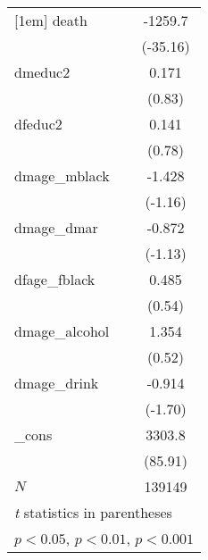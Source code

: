 {\begin{longtable}{l*{1}{c}}
[1em]
death       &     -1259.7\sym{***}\\
            &    (-35.16)         \\
[1em]
dmeduc2     &       0.171         \\
            &      (0.83)         \\
[1em]
dfeduc2     &       0.141         \\
            &      (0.78)         \\
[1em]
dmage\_mblack&      -1.428         \\
            &     (-1.16)         \\
[1em]
dmage\_dmar  &      -0.872         \\
            &     (-1.13)         \\
[1em]
dfage\_fblack&       0.485         \\
            &      (0.54)         \\
[1em]
dmage\_alcohol&       1.354         \\
            &      (0.52)         \\
[1em]
dmage\_drink &      -0.914         \\
            &     (-1.70)         \\
[1em]
\_cons      &      3303.8\sym{***}\\
            &     (85.91)         \\
\hline
\(N\)       &      139149         \\
\hline\hline
\multicolumn{2}{l}{\footnotesize \textit{t} statistics in parentheses}\\
\multicolumn{2}{l}{\footnotesize \sym{*} \(p<0.05\), \sym{**} \(p<0.01\), \sym{***} \(p<0.001\)}\\
\end{longtable}
}
